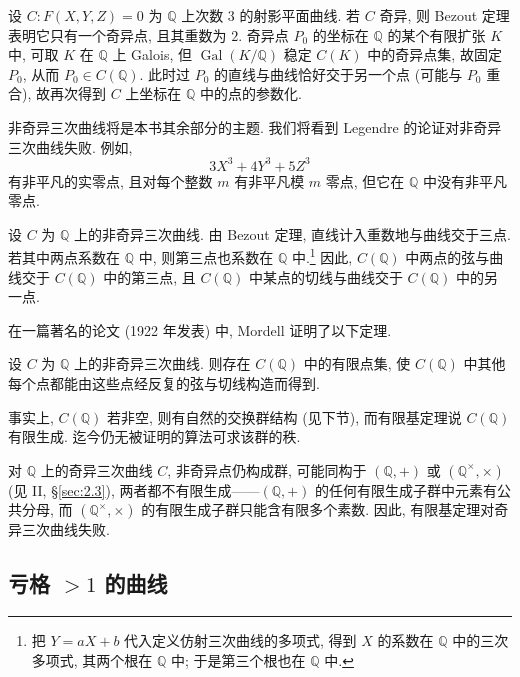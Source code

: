 设 $C\colon F(X,Y,Z) = 0$ 为 $\mathbb{Q}$ 上次数 $3$ 的射影平面曲线. 若 $C$ 奇异, 则 Bezout 定理表明它只有一个奇异点, 且其重数为 $2$. 奇异点 $P_0$ 的坐标在 $\mathbb{Q}$ 的某个有限扩张 $K$ 中, 可取 $K$ 在 $\mathbb{Q}$ 上 Galois, 但 $\operatorname{Gal}(K/\mathbb{Q})$ 稳定 $C(K)$ 中的奇异点集, 故固定 $P_0$, 从而 $P_0\in C(\mathbb{Q})$. 此时过 $P_0$ 的直线与曲线恰好交于另一个点 (可能与 $P_0$ 重合), 故再次得到 $C$ 上坐标在 $\mathbb{Q}$ 中的点的参数化.

非奇异三次曲线将是本书其余部分的主题. 我们将看到 Legendre 的论证对非奇异三次曲线失败. 例如,
\[
3X^3 + 4Y^3 + 5Z^3
\]
有非平凡的实零点, 且对每个整数 $m$ 有非平凡模 $m$ 零点, 但它在 $\mathbb{Q}$ 中没有非平凡零点.

设 $C$ 为 $\mathbb{Q}$ 上的非奇异三次曲线. 由 Bezout 定理, 直线计入重数地与曲线交于三点. 若其中两点系数在 $\mathbb{Q}$ 中, 则第三点也系数在 $\mathbb{Q}$ 中.\footnote{把 $Y = aX + b$ 代入定义仿射三次曲线的多项式, 得到 $X$ 的系数在 $\mathbb{Q}$ 中的三次多项式, 其两个根在 $\mathbb{Q}$ 中; 于是第三个根也在 $\mathbb{Q}$ 中.} 因此, $C(\mathbb{Q})$ 中两点的弦与曲线交于 $C(\mathbb{Q})$ 中的第三点, 且 $C(\mathbb{Q})$ 中某点的切线与曲线交于 $C(\mathbb{Q})$ 中的另一点.

在一篇著名的论文 (1922 年发表) 中, Mordell 证明了以下定理.

\begin{theorem}[有限基定理] \label{thm:1.2.1} 
设 $C$ 为 $\mathbb{Q}$ 上的非奇异三次曲线. 则存在 $C(\mathbb{Q})$ 中的有限点集, 使 $C(\mathbb{Q})$ 中其他每个点都能由这些点经反复的弦与切线构造而得到.
\end{theorem}

事实上, $C(\mathbb{Q})$ 若非空, 则有自然的交换群结构 (见下节), 而有限基定理说 $C(\mathbb{Q})$ 有限生成. 迄今仍无被证明的算法可求该群的秩.

\begin{remark} \label{thm:1.2.2} 
对 $\mathbb{Q}$ 上的奇异三次曲线 $C$, 非奇异点仍构成群, 可能同构于 $(\mathbb{Q},+)$ 或 $(\mathbb{Q}^{\times},\times)$ (见 II, \S\ref{sec:2.3}), 两者都不有限生成——$(\mathbb{Q},+)$ 的任何有限生成子群中元素有公共分母, 而 $(\mathbb{Q}^{\times},\times)$ 的有限生成子群只能含有限多个素数. 因此, 有限基定理对奇异三次曲线失败.
\end{remark}

\subsection*{亏格 $> 1$ 的曲线}

